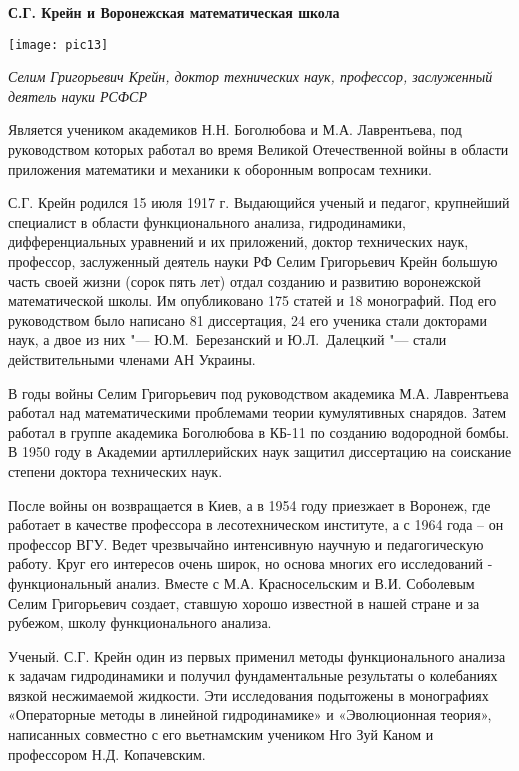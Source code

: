 \begin{center}
{\bf С.Г. Крейн и Воронежская математическая школа}

\vspace{3mm}

\texttt{[image: pic13]}


{\it Селим Григорьевич Крейн, доктор технических наук,
 профессор, заслуженный деятель науки РСФСР}
\end{center}

Является учеником академиков Н.Н. Боголюбова и М.А. Лаврентьева, под руководством которых работал во время Великой Отечественной войны в области приложения математики и механики к оборонным вопросам техники.

С.Г. Крейн родился 15 июля 1917 г. Выдающийся ученый и педагог, крупнейший специалист в области функционального анализа, гидродинамики, дифференциальных уравнений и их приложений, доктор технических наук, профессор, заслуженный деятель науки РФ Селим Григорьевич Крейн большую часть своей жизни (сорок пять лет) отдал созданию и развитию воронежской математической школы. Им опубликовано 175 статей и 18 монографий. Под его руководством было написано 81 диссертация, 24 его ученика стали докторами наук, а двое из них "--- Ю.М.~Березанский и Ю.Л.~Далецкий "--- стали действительными членами АН Украины.

В годы войны Селим Григорьевич под руководством академика М.А. Лаврентьева работал над математическими проблемами теории кумулятивных снарядов. Затем работал в группе академика Боголюбова в КБ-11 по созданию водородной бомбы. В 1950 году в Академии артиллерийских наук защитил диссертацию на соискание степени доктора технических наук.

После войны он возвращается в Киев, а в 1954 году приезжает в Воронеж, где работает в качестве профессора в лесотехническом институте, а с 1964 года – он профессор ВГУ. Ведет чрезвычайно интенсивную научную и педагогическую работу. Круг его интересов очень широк, но основа многих его исследований - функциональный анализ. Вместе с М.А. Красносельским и В.И. Соболевым Селим Григорьевич создает, ставшую хорошо известной в нашей стране и за рубежом, школу функционального анализа.

Ученый. С.Г. Крейн один из первых применил методы функционального анализа к задачам гидродинамики и получил фундаментальные результаты о колебаниях вязкой несжимаемой жидкости. Эти исследования подытожены в монографиях «Операторные методы в линейной гидродинамике» и «Эволюционная теория», написанных совместно с его вьетнамским учеником Нго Зуй Каном и профессором Н.Д. Копачевским.

